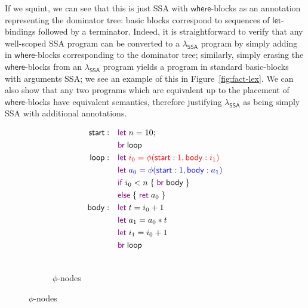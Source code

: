\documentclass[acmsmall,screen,review]{acmart}
\newcommand{\ms}[1]{\ensuremath{\mathsf{#1}}}
\newcommand{\kwms}[1]{\textcolor{violet}{\ms{#1}}}
\newcommand{\lbms}[1]{{\ms{#1}}}
\newcommand{\isotopessa}{\(\lambda_{\ms{SSA}}\)}
\begin{document}
If we squint, we can see that this is just SSA with \ms{where}-blocks as an annotation representing
the dominator tree: basic blocks correspond to sequences of \ms{let}-bindings followed by a
terminator. Indeed, it is straightforward to verify that any well-scoped SSA program can be
converted to a \isotopessa{} program by simply adding in \ms{where}-blocks corresponding to the
dominator tree; similarly, simply erasing the \ms{where}-blocks from an \isotopessa{} program yields
a program in standard basic-blocks with arguments SSA; we see an example of this in
Figure~\ref{fig:fact-lex}. We can also show that any two programs which are equivalent up to the
placement of \ms{where}-blocks have equivalent semantics, therefore justifying \isotopessa{} as
being simply SSA with additional annotations.

\begin{figure}
  \begin{subfigure}[t]{.35\textwidth}
    \centering
    \begin{adjustbox}{minipage=1.2\textwidth,scale=0.8}
    \begin{align*}
      \lbms{start}:\quad  & \kwms{let}\;n = 10; \\
                          & \kwms{br}\;\ms{loop} \\
      \lbms{loop}: \quad  & \begingroup \color{red}
                            \kwms{let}\;i_0 = \phi(\ms{start}: 1, \ms{body}: i_1) 
                          \endgroup \\
                          & \begingroup \color{blue}
                            \kwms{let}\;a_0 = \phi(\ms{start}: 1, \ms{body}: a_1) 
                          \endgroup \\
                          & \kwms{if}\;i_0 < n\;\{\;\kwms{br}\;\lbms{body}\;\} \\
                          & \kwms{else}\;\{\;\kwms{ret}\;a_0\;\} \\
      \lbms{body}: \quad  & \kwms{let}\;t = i_0 + 1 \\
                          & \kwms{let}\;a_1 = a_0 * t \\
                          & \kwms{let}\;i_1 = i_0 + 1 \\
                          & \kwms{br}\;\lbms{loop} \\ \\
    \end{align*}
    \end{adjustbox}
    \caption{$\phi$-nodes}
    \label{fig:fact-phi}
  \end{subfigure}%

\end{figure}
\end{document}

